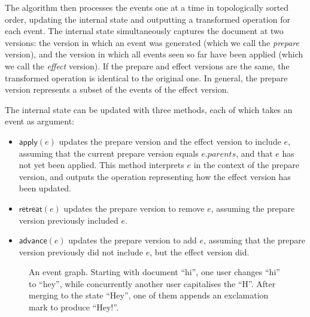 \documentclass[sigplan,10pt]{acmart}
\begin{document}
The algorithm then processes the events one at a time in topologically sorted order, updating the internal state and outputting a transformed operation for each event.
The internal state simultaneously captures the document at two versions: the version in which an event was generated (which we call the \emph{prepare} version), and the version in which all events seen so far have been applied (which we call the \emph{effect} version).
If the prepare and effect versions are the same, the transformed operation is identical to the original one.
In general, the prepare version represents a subset of the events of the effect version.

The internal state can be updated with three methods, each of which takes an event as argument:

\begin{itemize}
\item $\mathsf{apply}(e)$ updates the prepare version and the effect version to include $e$, assuming that the current prepare version equals $e.\mathit{parents}$, and that $e$ has not yet been applied. This method interprets $e$ in the context of the prepare version, and outputs the operation representing how the effect version has been updated.
\item $\mathsf{retreat}(e)$ updates the prepare version to remove $e$, assuming the prepare version previously included $e$.
\item $\mathsf{advance}(e)$ updates the prepare version to add $e$, assuming that the prepare version previously did not include $e$, but the effect version did.
\end{itemize}

\begin{figure}
  \caption{An event graph. Starting with document ``hi'', one user changes ``hi'' to ``hey'', while concurrently another user capitalises the ``H''. After merging to the state ``Hey'', one of them appends an exclamation mark to produce ``Hey!''.}
  \label{graph-hi-hey}
\end{figure}
\end{document}
